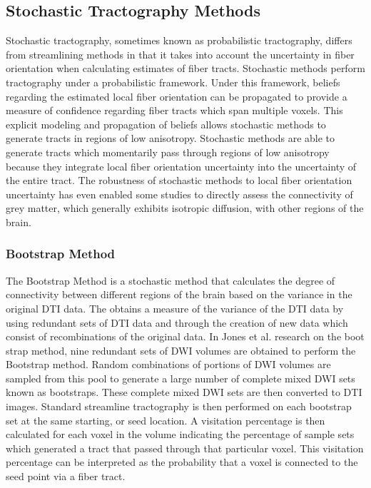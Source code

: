 \subsection{Stochastic Tractography Methods}
Stochastic tractography, sometimes known as probabilistic tractography, differs from streamlining methods in that it takes into account the uncertainty in fiber orientation when calculating estimates of fiber tracts.  Stochastic methods perform tractography under a probabilistic framework.  Under this framework, beliefs regarding the estimated local fiber orientation can be propagated to provide a measure of confidence regarding fiber tracts which span multiple voxels.  This explicit modeling and propagation of beliefs allows stochastic methods to generate tracts in regions of low anisotropy. Stochastic methods are able to generate tracts which momentarily pass through regions of low anisotropy because they integrate local fiber orientation uncertainty into the uncertainty of the entire tract.  The robustness of stochastic methods to local fiber orientation uncertainty has even enabled some studies to directly assess the connectivity of grey matter, which generally exhibits isotropic diffusion, with other regions of the brain\cite{behrensMRM03}.

\subsubsection{Bootstrap Method}

The Bootstrap Method is a stochastic method that calculates the degree of connectivity between different regions of the brain based on the variance in the original DTI data.  The obtains a measure of the variance of the DTI data by using redundant sets of DTI data and through the creation of new data which consist of recombinations of the original data.  In Jones et al. \cite{derek} research on the boot strap method, nine redundant sets of DWI volumes are obtained to perform the Bootstrap method.  Random combinations of portions of DWI volumes are sampled from this pool to generate a large number of complete mixed DWI sets known as bootstraps.  These complete mixed DWI sets are then converted to DTI images.  Standard streamline tractography is then performed on each bootstrap set at the same starting, or seed location.  A visitation percentage is then calculated for each voxel in the volume indicating the percentage of sample sets which generated a tract that passed through that particular voxel.  This visitation percentage can be interpreted as the probability that a voxel is connected to the seed point via a fiber tract.

